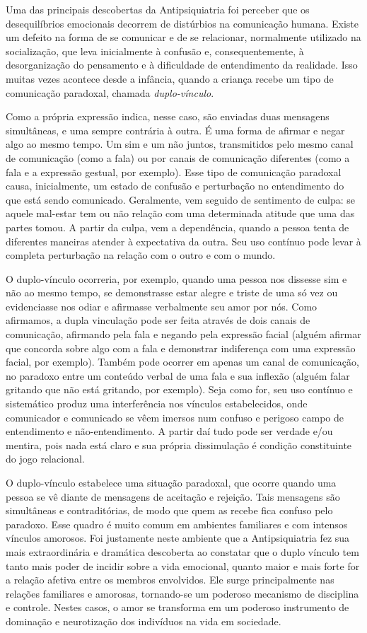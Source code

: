 Uma das principais descobertas da Antipsiquiatria foi perceber que os
desequilíbrios emocionais decorrem de distúrbios na comunicação humana.
Existe um defeito na forma de se comunicar e de se relacionar,
normalmente utilizado na socialização, que leva inicialmente à confusão
e, consequentemente, à desorganização do pensamento e à dificuldade de
entendimento da realidade. Isso muitas vezes acontece desde a infância,
quando a criança recebe um tipo de comunicação paradoxal, chamada
\emph{duplo-vínculo}.

Como a própria expressão indica, nesse caso, são enviadas duas mensagens
simultâneas, e uma sempre contrária à outra. É uma forma de afirmar e
negar algo ao mesmo tempo. Um sim e um não juntos, transmitidos pelo
mesmo canal de comunicação (como a fala) ou por canais de comunicação
diferentes (como a fala e a expressão gestual, por exemplo). Esse tipo
de comunicação paradoxal causa, inicialmente, um estado de confusão e
perturbação no entendimento do que está sendo comunicado. Geralmente,
vem seguido de sentimento de culpa: se aquele mal-estar tem ou não
relação com uma determinada atitude que uma das partes tomou. A partir
da culpa, vem a dependência, quando a pessoa tenta de diferentes
maneiras atender à expectativa da outra. Seu uso contínuo pode levar à
completa perturbação na relação com o outro e com o mundo.

O duplo-vínculo ocorreria, por exemplo, quando uma pessoa nos dissesse
sim e não ao mesmo tempo, se demonstrasse estar alegre e triste de uma
só vez ou evidenciasse nos odiar e afirmasse verbalmente seu amor por
nós. Como afirmamos, a dupla vinculação pode ser feita através de dois
canais de comunicação, afirmando pela fala e negando pela expressão
facial (alguém afirmar que concorda sobre algo com a fala e demonstrar
indiferença com uma expressão facial, por exemplo). Também pode ocorrer
em apenas um canal de comunicação, no paradoxo entre um conteúdo verbal
de uma fala e sua inflexão (alguém falar gritando que não está gritando,
por exemplo). Seja como for, seu uso contínuo e sistemático produz uma
interferência nos vínculos estabelecidos, onde comunicador e comunicado
se vêem imersos num confuso e perigoso campo de entendimento e
não-entendimento. A partir daí tudo pode ser verdade e/ou mentira, pois
nada está claro e sua própria dissimulação é condição constituinte do
jogo relacional.

O duplo-vínculo estabelece uma situação paradoxal, que ocorre quando uma
pessoa se vê diante de mensagens de aceitação e rejeição. Tais mensagens
são simultâneas e contraditórias, de modo que quem as recebe fica
confuso pelo paradoxo. Esse quadro é muito comum em ambientes familiares
e com intensos vínculos amorosos. Foi justamente neste ambiente que a
Antipsiquiatria fez sua mais extraordinária e dramática descoberta ao
constatar que o duplo vínculo tem tanto mais poder de incidir sobre a
vida emocional, quanto maior e mais forte for a relação afetiva entre os
membros envolvidos. Ele surge principalmente nas relações familiares e
amorosas, tornando-se um poderoso mecanismo de disciplina e controle.
Nestes casos, o amor se transforma em um poderoso instrumento de
dominação e neurotização dos indivíduos na vida em sociedade.

